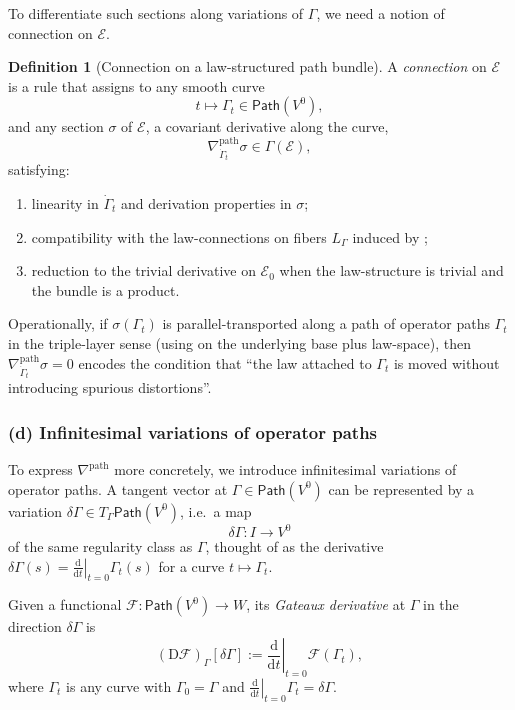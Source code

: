 \documentclass[11pt]{book}
\theoremstyle{plain}
\theoremstyle{definition}
\newtheorem{definition}[theorem]{Definition} \theoremstyle{remark}
\begin{document}
To differentiate such sections along variations of $\Gamma$, we need a
notion of connection on $\mathcal{E}$.

\begin{definition}[Connection on a law-structured path bundle]
A \emph{connection} on $\mathcal{E}$ is a rule that assigns to any
  smooth curve
  \[
     t\mapsto\Gamma_t
     \in\mathsf{Path}(V^0),
  \]
  and any section $\sigma$ of $\mathcal{E}$, a covariant derivative
  along the curve,
  \[
     \nabla^{\mathrm{path}}_{\dot{\Gamma}_t}\sigma
     \in\Gamma(\mathcal{E}),
  \]
  satisfying:
  \begin{enumerate}[label=\roman*)]
    \item linearity in $\dot{\Gamma}_t$ and derivation properties in
          $\sigma$;
    \item compatibility with the law-connections on fibers $L_\Gamma$
          induced by \GZLOC;
    \item reduction to the trivial derivative on $\mathcal{E}_0$ when
          the law-structure is trivial and the bundle is a product.
  \end{enumerate}
\end{definition}

Operationally, if $\sigma(\Gamma_t)$ is parallel-transported along a
path of operator paths $\Gamma_t$ in the triple-layer sense (using
\GZTLC on the underlying base plus law-space), then
$\nabla^{\mathrm{path}}_{\dot{\Gamma}_t}\sigma=0$ encodes the condition
that “the law attached to $\Gamma_t$ is moved without introducing
spurious distortions”.



\subsubsection*{(d) Infinitesimal variations of operator paths}

To express $\nabla^{\mathrm{path}}$ more concretely, we introduce
infinitesimal variations of operator paths. A tangent vector at
$\Gamma\in\mathsf{Path}(V^0)$ can be represented by a variation
$\delta\Gamma\in T_\Gamma\mathsf{Path}(V^0)$, i.e.\ a map
\[
   \delta\Gamma:I\to V^0
\]
of the same regularity class as $\Gamma$, thought of as the derivative
$\delta\Gamma(s) = \left.\frac{\mathrm{d}}{\mathrm{d}t}
\right|_{t=0}\Gamma_t(s)$ for a curve $t\mapsto\Gamma_t$.

Given a functional $\mathcal{F}:\mathsf{Path}(V^0)\to W$, its
\emph{Gateaux derivative} at $\Gamma$ in the direction $\delta\Gamma$
is
\[
   (\mathrm{D}\mathcal{F})_\Gamma[\delta\Gamma]
   :=
   \left.
     \frac{\mathrm{d}}{\mathrm{d}t}
   \right|_{t=0}
   \mathcal{F}(\Gamma_t),
\]
where $\Gamma_t$ is any curve with $\Gamma_0=\Gamma$ and
$\left.\frac{\mathrm{d}}{\mathrm{d}t}\right|_{t=0}\Gamma_t
=\delta\Gamma$.
\end{document}
